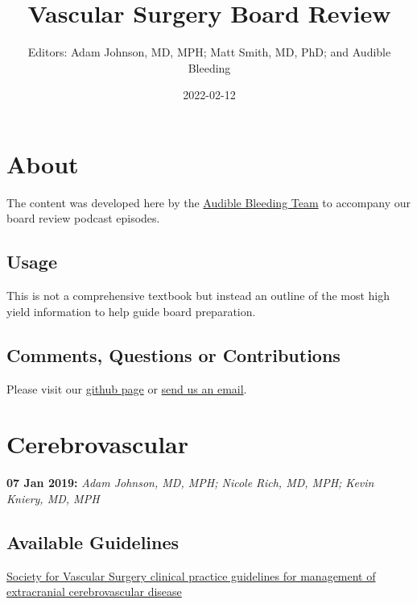 \documentclass[
]{book}
\title{Vascular Surgery Board Review}
\author{Editors: Adam Johnson, MD, MPH; Matt Smith, MD, PhD; and Audible Bleeding}
\date{2022-02-12}
\begin{document}
\maketitle

{
\setcounter{tocdepth}{1}
\tableofcontents
}
\hypertarget{about}{%
\chapter{About}\label{about}}

The content was developed here by the \href{https://www.audiblebleeding.com/about-1/}{Audible Bleeding Team} to accompany our board review podcast episodes.

\hypertarget{usage}{%
\section{Usage}\label{usage}}

This is not a comprehensive textbook but instead an outline of the most high yield information to help guide board preparation.

\hypertarget{comments-questions-or-contributions}{%
\section{Comments, Questions or Contributions}\label{comments-questions-or-contributions}}

Please visit our \href{https://github.com/adam-mdmph/VS-Board-Review}{github page} or \href{mailto:audiblebleeding@vascularsociety.org}{send us an email}.

\hypertarget{cerebrovascular}{%
\chapter{Cerebrovascular}\label{cerebrovascular}}

\textbf{07 Jan 2019:} \emph{Adam Johnson, MD, MPH; Nicole Rich, MD, MPH; Kevin
Kniery, MD, MPH}

\hypertarget{available-guidelines}{%
\section{Available Guidelines}\label{available-guidelines}}

\href{https://www.jvascsurg.org/article/S0741-5214(21)00893-4/fulltext}{Society for Vascular Surgery clinical practice guidelines for
management of extracranial cerebrovascular
disease}
\citep{aburahmaSocietyVascularSurgery2022}
\end{document}
